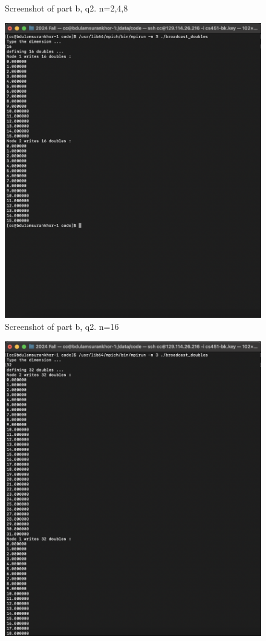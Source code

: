\documentclass{article}
\begin{document}
\begin{enumerate}
\begin{enumerate}
\begin{enumerate}
\begin{figure}[H]
        \caption{Screenshot of part b, q2. n=2,4,8}
      \end{figure}
      \begin{figure}[H]
        \centering
        \includegraphics[width=\textwidth]{image5.png}
        \caption{Screenshot of part b, q2. n=16}
      \end{figure}
      \begin{figure}[H]
        \centering
        \includegraphics[width=\textwidth]{image6.png}

\end{figure}
\end{enumerate}
\end{enumerate}
\end{enumerate}
\end{document}
